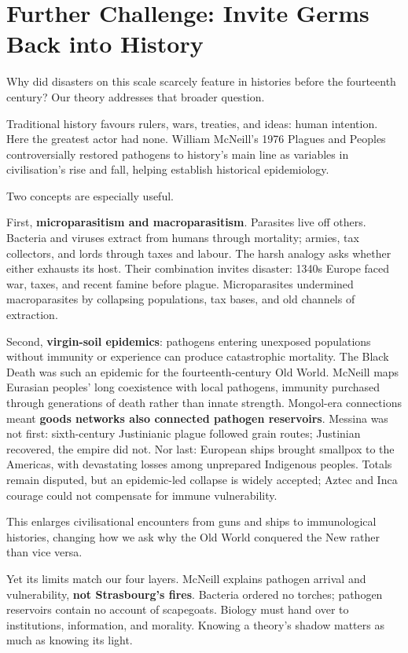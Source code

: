 \section[Further Challenge: Germs in History]{Further Challenge: Invite Germs Back into History}
Why did disasters on this scale scarcely feature in histories before the fourteenth century? Our theory addresses that broader question.

Traditional history favours rulers, wars, treaties, and ideas: human intention. Here the greatest actor had none. William McNeill's 1976 Plagues and Peoples controversially restored pathogens to history's main line as variables in civilisation's rise and fall, helping establish historical epidemiology.

Two concepts are especially useful.

First, \textbf{microparasitism and macroparasitism}. Parasites live off others. Bacteria and viruses extract from humans through mortality; armies, tax collectors, and lords through taxes and labour. The harsh analogy asks whether either exhausts its host. Their combination invites disaster: 1340s Europe faced war, taxes, and recent famine before plague. Microparasites undermined macroparasites by collapsing populations, tax bases, and old channels of extraction.

Second, \textbf{virgin-soil epidemics}: pathogens entering unexposed populations without immunity or experience can produce catastrophic mortality. The Black Death was such an epidemic for the fourteenth-century Old World. McNeill maps Eurasian peoples' long coexistence with local pathogens, immunity purchased through generations of death rather than innate strength. Mongol-era connections meant \textbf{goods networks also connected pathogen reservoirs}. Messina was not first: sixth-century Justinianic plague followed grain routes; Justinian recovered, the empire did not. Nor last: European ships brought smallpox to the Americas, with devastating losses among unprepared Indigenous peoples. Totals remain disputed, but an epidemic-led collapse is widely accepted; Aztec and Inca courage could not compensate for immune vulnerability.

This enlarges civilisational encounters from guns and ships to immunological histories, changing how we ask why the Old World conquered the New rather than vice versa.

Yet its limits match our four layers. McNeill explains pathogen arrival and vulnerability, \textbf{not Strasbourg's fires}. Bacteria ordered no torches; pathogen reservoirs contain no account of scapegoats. Biology must hand over to institutions, information, and morality. Knowing a theory's shadow matters as much as knowing its light.

